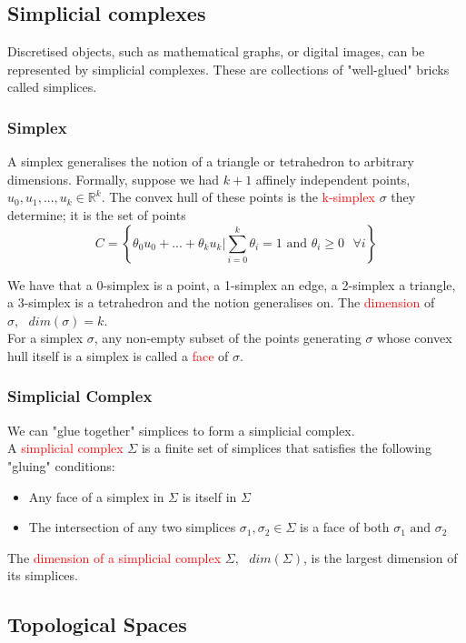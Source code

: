 \documentclass[a4paper]{article}
\begin{document}
\subsection*{Simplicial complexes}
Discretised objects, such as mathematical graphs, or digital images, can be represented by simplicial complexes. These are collections of "well-glued" bricks called simplices.

\subsubsection*{Simplex}
A simplex generalises the notion of a triangle or tetrahedron to arbitrary dimensions.
Formally, suppose we had $k+1$ affinely independent points, $u_{0}, u_{1}, ..., u_{k} \in \mathbb{R}^{k}$. The convex hull of these points is the \textcolor{red}{k-simplex} $\sigma$ they determine; it is the set of points
\[C = \left\{ \theta_{0} u_{0} + ... + \theta_{k} u_{k} | \sum_{i = 0}^{k} \theta_{i} = 1 \text{ and } \theta_{i} \geq 0 \text{ } \forall i \right\} \]

We have that a 0-simplex is a point, a 1-simplex an edge, a 2-simplex a triangle, a 3-simplex is a tetrahedron and the notion generalises on. The \textcolor{red}{dimension} of $\sigma, \text{ } dim(\sigma) = k$.
\\
For a simplex $\sigma$, any non-empty subset of the points generating $\sigma$ whose convex hull itself is a simplex is called a \textcolor{red}{face} of $\sigma$.
\\
\subsubsection*{Simplicial Complex}
We can "glue together" simplices to form a simplicial complex.
\\
A \textcolor{red}{simplicial complex} $\Sigma$ is a finite set of simplices that satisfies the following "gluing" conditions:
\begin{itemize}
\item Any face of a simplex in $\Sigma$ is itself in $\Sigma$
\item The intersection of any two simplices $ \sigma_{1}, \sigma_{2} \in \Sigma$ is a face of both $\sigma_{1} \text{ and } \sigma_{2}$
\end{itemize}

The \textcolor{red}{dimension of a simplicial complex} $\Sigma, \text{ } dim(\Sigma)$, is the largest dimension of its simplices.

\subsection*{Topological Spaces}
\end{document}
